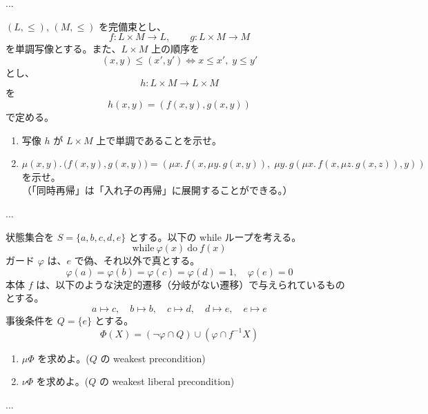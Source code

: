 \documentclass[
		head_space=20mm,
		foot_space=20mm,
		gutter=10mm,
		line_length=190mm
]{jlreq}
\begin{document}
\begin{answer}
	... 
\end{answer}


\begin{practice} %
	$(L,\leq)$, $(M,\leq)$ を完備束とし、
	\[f:L\times M\to L,\qquad g:L\times M\to M\] を単調写像とする。また、$L\times M$ 上の順序を \[(x,y)\leq(x',y')\iff x\leq x',\; y\leq y'\] とし、
	\[h:L\times M\to L\times M\] を
	\[h(x,y)=(f(x,y),g(x,y))\] で定める。
	\begin{enumerate}
		\item 写像 $h$ が $L\times M$ 上で単調であることを示せ。
		\item $\mu(x,y).\,\bigl(f(x,y),g(x,y)\bigr)=\left( \mu x.\, f(x,\mu y.\,g(x,y)), \; \mu y.\,g(\mu x.\, f(x,\mu z.\,g(x,z)),y) \right)$ を示せ。
		\\（「同時再帰」は「入れ子の再帰」に展開することができる。）
	\end{enumerate}
\end{practice}

\begin{answer}
	... 
\end{answer}

\clearpage

\begin{practice}[wp と wlp]
	状態集合を $S=\{a,b,c,d,e\}$ とする。以下の while ループを考える。
	\[\mathrm{while}~\varphi(x)~\mathrm{do}~f(x)\]
	ガード $\varphi$ は、$e$ で偽、それ以外で真とする。
	\[\varphi(a)=\varphi(b)=\varphi(c)=\varphi(d)=1,\quad \varphi(e)=0\]
	本体 $f$ は、以下のような決定的遷移（分岐がない遷移）で与えられているものとする。 \[a\mapsto c,\quad b\mapsto b,\quad c\mapsto d,\quad d\mapsto e,\quad e\mapsto e\] 事後条件を $Q=\{e\}$ とする。%
	\[\Phi(X)=(\neg\varphi\cap Q)\cup(\varphi\cap f^{-1}X)\]
	\begin{enumerate}
		\item $\mu\Phi$ を求めよ。($Q$ の weakest precondition)
		\item $\nu\Phi$ を求めよ。($Q$ の weakest liberal precondition)
	\end{enumerate}
\end{practice}

\begin{answer}
	... 
\end{answer}
\end{document}

